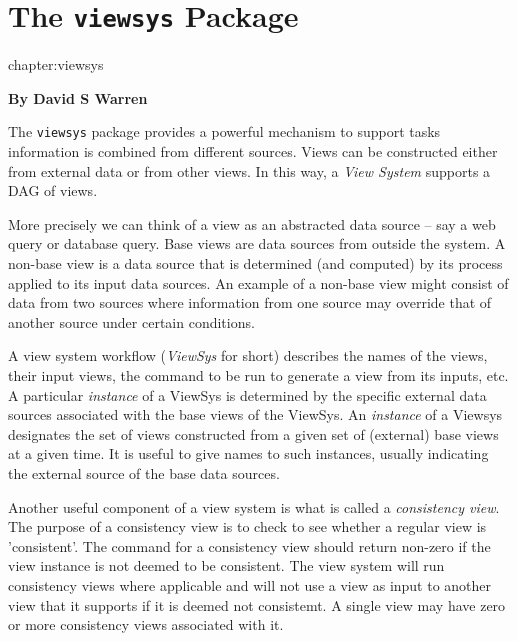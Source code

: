 

\chapter{The {\tt viewsys} Package}{chapter:viewsys}

  \begin{center}
    {\Large {\bf By David S Warren}}
  \end{center}

The {\tt viewsys} package provides a powerful mechanism to support
tasks information is combined from different sources.  Views can be
constructed either from external data or from other views.  In this
way, a {\em View System} supports a DAG of views.


More precisely we can think of a view as an abstracted data source --
say a web query or database query.  Base views are data sources from
outside the system.  A non-base view is a data source that is
determined (and computed) by its process applied to its input data
sources.  An example of a non-base view might consist of data from two
sources where information from one source may override that of another
source under certain conditions.


A view system workflow ({\em ViewSys} for short) describes the names
of the views, their input views, the command to be run to generate a
view from its inputs, etc.  A particular {\em instance} of a ViewSys
is determined by the specific external data sources associated with
the base views of the ViewSys.  An {\em instance} of a Viewsys
designates the set of views constructed from a given set of (external)
base views at a given time.  It is useful to give names to such
instances, usually indicating the external source of the base data
sources.  

Another useful component of a view system is what is called a {\em
  consistency view}.  The purpose of a consistency view is to check to
see whether a regular view is 'consistent'.  The command for a
consistency view should return non-zero if the view instance is not
deemed to be consistent.
%
The view system will run consistency views where applicable and will
not use a view as input to another view that it supports if it is
deemed not consistemt.  A single view may have zero or more
consistency views associated with it.


